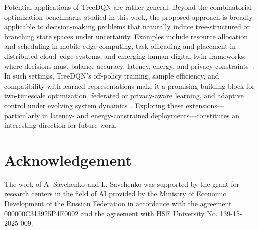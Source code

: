 \documentclass[preprint,12pt]{elsarticle} %
\theoremstyle{plain}
\theoremstyle{definition}
\theoremstyle{remark}
\begin{document}
Potential applications of TreeDQN are rather general. Beyond the combinatorial-optimization benchmarks studied in this work, the proposed approach is broadly applicable to decision-making problems that naturally induce tree-structured or branching state spaces under uncertainty. Examples include resource allocation and scheduling in mobile edge computing, task offloading and placement in distributed cloud–edge systems, and emerging human digital twin frameworks, where decisions must balance accuracy, latency, energy, and privacy constraints~\cite{yang2024dynamic}. In such settings, TreeDQN’s off-policy training, sample efficiency, and compatibility with learned representations make it a promising building block for two-timescale optimization, federated or privacy-aware learning, and adaptive control under evolving system dynamics~\cite{okegbile2023differentially}. Exploring these extensions—particularly in latency- and energy-constrained deployments—constitutes an interesting direction for future work.


\section*{Acknowledgement}
The work of A. Savchenko and L. Savchenko was supported by the grant for research centers in the field of AI provided by the Ministry of Economic Development of the Russian Federation in accordance with the agreement 000000C313925P4E0002 and the agreement with HSE University No. 139-15-2025-009. 



\end{document}
